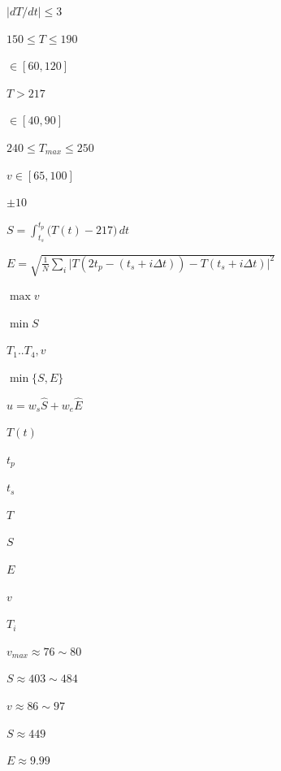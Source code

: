 
$|dT/dt|\le3$

$150\le T\le190$

$\in[60,120]$

$T>217$

$\in[40,90]$

$240\le T_{max}\le250$

$v\in[65,100]$

$\pm10$

$S=\int_{t_s}^{t_p}\big(T(t)-217\big)\,dt$

$E=\sqrt{\frac1N\sum_i\big|T(2t_p-(t_s+i\Delta t))-T(t_s+i\Delta t)\big|^2}$

$\max v$

$\min S$

$T_1..T_4,v$

$\min\{S,E\}$

$u=w_s\hat S+w_e\hat E$

$T(t)$

$t_p$

$t_s$

$T$

$S$

$E$

$v$

$T_i$

$v_{max}\approx76\sim80$

$S\approx403\sim484$

$v\approx86\sim97$

$S\approx449$

$E\approx9.99$

